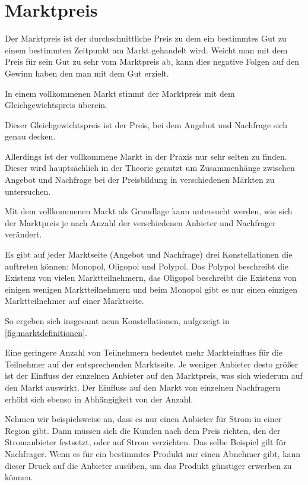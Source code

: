 \section{Marktpreis}
\label{sec:marktpreis}
Der Marktpreis ist der durchschnittliche Preis zu dem ein bestimmtes Gut zu einem bestimmten Zeitpunkt am Markt gehandelt wird. Weicht man mit dem Preis für sein Gut zu sehr vom Marktpreis ab, kann dies negative Folgen auf den Gewinn haben den man mit dem Gut erzielt. \autocite[142]{Schinnerl2021}
 

In einem vollkommenen Markt stimmt der Marktpreis mit dem Gleichgewichtspreis überein. \autocite[132]{Forner2022}

Dieser Gleichgewichtspreis ist der Preis, bei dem Angebot und Nachfrage sich genau decken. \autocite[178]{Forner2022}

Allerdings ist der vollkommene Markt in der Praxis nur sehr selten zu finden. Dieser wird hauptsächlich in der Theorie genutzt um Zusammenhänge zwischen Angebot und Nachfrage bei der Preisbildung in verschiedenen Märkten zu untersuchen.\autocite[93]{Pollert2013}

Mit dem vollkommenen Markt als Grundlage kann untersucht werden, wie sich der Marktpreis je nach Anzahl der verschiedenen Anbieter und Nachfrager verändert. 

Es gibt auf jeder Marktseite (Angebot und Nachfrage) drei Konstellationen die auftreten können: Monopol, Oligopol und Polypol. Das Polypol beschreibt die Existenz von vielen Marktteilnehmern, das Oligopol beschreibt die Existenz von einigen wenigen Marktteilnehmern und beim Monopol gibt es nur einen einzigen Marktteilnehmer auf einer Marktseite.

So ergeben sich insgesamt neun Konstellationen, aufgezeigt in \autoref{fig:marktdefinitionen}.

Eine geringere Anzahl von Teilnehmern bedeutet mehr Markteinfluss für die Teilnehmer auf der entsprechenden Marktseite. Je weniger Anbieter desto grö\ss{}er ist der Einfluss der einzelnen Anbieter auf den Marktpreis, was sich wiederum auf den Markt auswirkt. Der Einfluss auf den Markt von einzelnen Nachfragern erhöht sich ebenso in Abhängigkeit von der Anzahl.

Nehmen wir beispielsweise an, dass es nur einen Anbieter für Strom in einer Region gibt. Dann müssen sich die Kunden nach dem Preis richten, den der Stromanbieter festsetzt, oder auf Strom verzichten. Das selbe Beispiel gilt für Nachfrager. Wenn es für ein bestimmtes Produkt nur einen Abnehmer gibt, kann dieser Druck auf die Anbieter ausüben, um das Produkt günstiger erwerben zu können.

